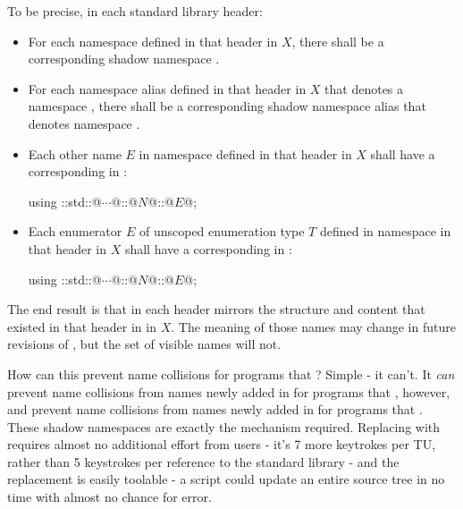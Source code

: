 To be precise, in each standard library header:
\begin{itemize}
\item For each namespace  defined in that header
  in \Cpp$X$, there shall be a corresponding shadow namespace
  .

\item For each namespace alias  defined in that
  header in \Cpp$X$ that denotes a namespace
  , there shall be
  a corresponding shadow namespace alias
   that denotes namespace
  .

\item Each other name $E$ in namespace 
  defined in that header in \Cpp$X$ shall have a corresponding
   in :
  \begin{codeblock}
  using ::std::@$\cdots$@::@$N$@::@$E$@;
  \end{codeblock}

\item Each enumerator $E$ of unscoped enumeration type $T$ defined in namespace
   in that header in \Cpp$X$ shall have
  a corresponding 
  in :
  \begin{codeblock}
  using ::std::@$\cdots$@::@$N$@::@$E$@;
  \end{codeblock}
\end{itemize}
The end result is that  in each header mirrors
the structure and content that existed in that header in  in \Cpp$X$.
The meaning of those names may change in future revisions of \Cpp, but the set
of visible names will not.

How can this prevent name collisions for programs that
? Simple - it can't. It \emph{can} prevent name
collisions from names newly added in  for programs that
, however, and prevent name collisions
from names newly added in  for programs that
. These shadow namespaces are exactly the
mechanism required. Replacing  with
 requires almost no additional effort from
users - it's 7 more keytrokes per TU, rather than 5 keystrokes per reference to
the standard library - and the replacement is easily toolable - a 
script could update an entire source tree in no time with almost no chance for
error.

